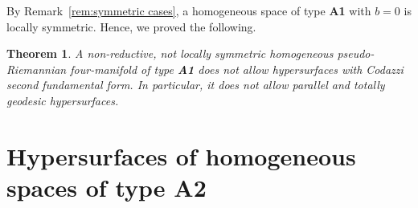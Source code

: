 \documentclass{amsart}
\theoremstyle{plain}
\newtheorem{theorem}{Theorem}
\newtheorem{lemma}{Lemma}
\theoremstyle{remark}
\def\R{\mathbb{R}}
\begin{document}
{By Remark~\ref{rem:symmetric cases}, a homogeneous space of type \textbf{A1} with $b=0$ is locally symmetric. Hence, we proved the following.

\begin{theorem}
A non-reductive, not locally symmetric homogeneous pseudo-Riemannian four-man\-if\-old of type {\rm\bf A1} does not allow hypersurfaces with Codazzi second fundamental form. In particular, it does not allow parallel and totally geodesic hypersurfaces.
\end{theorem}
 





\section{Hypersurfaces of homogeneous spaces of type \textbf{A2}}
\setcounter{equation}{0}

}
\end{document}
